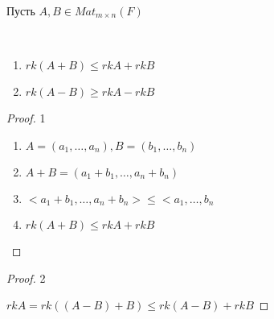 \begin{lemma}
    
    Пусть $A, B \in Mat_{m \times n}(F)$

    \begin{properties}~
        
        \begin{enumerate}
            \item $rk(A + B) \leq rk A + rk B$
            \item $rk(A - B) \geq rk A - rk B$
        \end{enumerate}

    \end{properties}

    \bigskip

    \begin{proof} 1~

        \begin{enumerate}
            \item $A = \left(a_1, \dots, a_n\right), B = \left(b_1, \dots, b_n\right)$
            \item $A + B = \left(a_1 + b_1, \dots, a_n + b_n\right)$
            \item $<a_1 + b_1, \dots, a_n + b_n> \leq <a_1, \dots, b_n$
            \item $rk(A + B) \leq rk A + rk B$
        \end{enumerate}
        
    \end{proof}

    \bigskip

    \begin{proof} 2~

        $rk A = rk ((A - B) + B) \leq rk (A - B) + rk B$
        
    \end{proof}

    \bigskip

    \begin{comment}
    
        Эти неравенства достигаются (например при $B = 0$)

    \end{comment}

\end{lemma}


\bigskip


